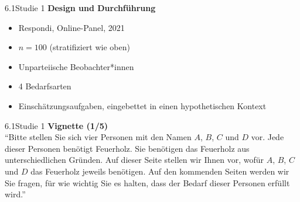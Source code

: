 \documentclass[xcolor=table,9pt,aspectratio=169]{beamer}
\begin{document}
\begin{frame}{\vspace*{10mm}6.1\hspace*{1em}Studie 1}
\textbf{Design und Durchführung}\\
\begin{itemize}
   \item Respondi, Online-Panel, 2021
   \item $n=100$ (stratifiziert wie oben)
   \item Unparteiische Beobachter*innen
   \item 4 Bedarfsarten
   \item Einschätzungsaufgaben, eingebettet in einen hypothetischen Kontext
\end{itemize}
\end{frame}


\begin{frame}{\vspace*{10mm}6.1\hspace*{1em}Studie 1}
\textbf{Vignette (1/5)}\\
\medskip
\enquote{Bitte stellen Sie sich vier Personen mit den Namen $A$, $B$, $C$ und $D$ vor. Jede dieser Personen benötigt Feuerholz. Sie benötigen das Feuerholz aus unterschiedlichen Gründen. Auf dieser Seite stellen wir Ihnen vor, wofür $A$, $B$, $C$ und $D$ das Feuerholz jeweils benötigen. Auf den kommenden Seiten werden wir Sie fragen, für wie wichtig Sie es halten, dass der Bedarf dieser Personen erfüllt wird.}
\end{frame}
\end{document}
